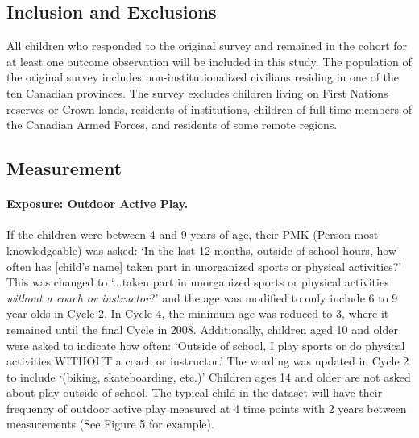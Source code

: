 \documentclass [11pt]{article}
\begin{document}
\subsection{Inclusion and Exclusions} All children who responded to the original survey and remained in the cohort for at least one outcome observation will be included in this study. The population of the original survey includes non-institutionalized civilians residing in one of the ten Canadian provinces. The survey excludes children living on First Nations reserves or Crown lands, residents of institutions, children of full-time members of the Canadian Armed Forces, and residents of some remote regions.~\cite{Government_of_Canada2009-ep}

\subsection{Measurement}
\paragraph{Exposure: Outdoor Active Play.} If the children were between 4 and 9 years of age, their PMK (Person most knowledgeable) was asked: `In the last 12 months, outside of school hours, how often has [child's name] taken part in unorganized sports or physical activities?' This was changed to `...taken part in unorganized sports or physical activities \emph{without a coach or instructor}?' and the age was modified to only include 6 to 9 year olds in Cycle 2. In Cycle 4, the minimum age was reduced to 3, where it remained until the final Cycle in 2008. Additionally, children aged 10 and older were asked to indicate how often: `Outside of school, I play sports or do physical activities WITHOUT a coach or instructor.' The wording was updated in Cycle 2 to include `(biking, skateboarding, etc.)' Children ages 14 and older are not asked about play outside of school. The typical child in the dataset will have their frequency of outdoor active play measured at 4 time points with 2 years between measurements (See Figure 5 for example). 
\end{document}
